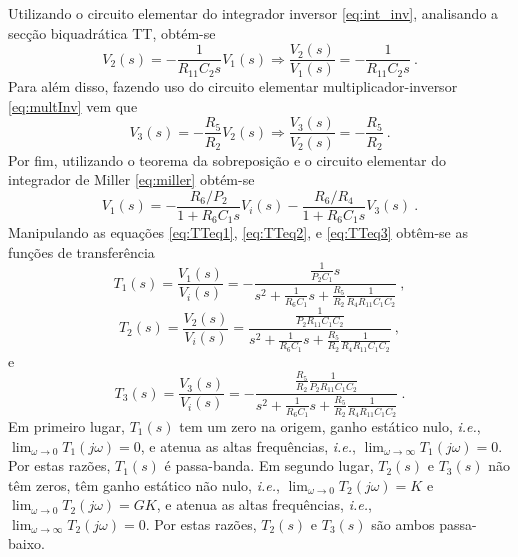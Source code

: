 Utilizando o circuito elementar do integrador inversor \eqref{eq:int_inv}, analisando a secção biquadrática TT, obtém-se
\begin{equation}\label{eq:TTeq1}
    V_2(s) = -\frac{1}{R_{11}C_2s}V_1(s)  \Rightarrow \frac{V_2(s)}{V_1(s)} = -\frac{1}{R_{11}C_2s}\:.
\end{equation}
Para além disso, fazendo uso do circuito elementar multiplicador-inversor \eqref{eq:multInv} vem que 
\begin{equation}\label{eq:TTeq2}
    V_3(s) = -\frac{R_5}{R_2}V_2(s) \Rightarrow \frac{V_3(s)}{V_2(s)} = -\frac{R_5}{R_2}\:.
\end{equation}
Por fim, utilizando o teorema da sobreposição e o circuito elementar do integrador de Miller \eqref{eq:miller} obtém-se
\begin{equation}\label{eq:TTeq3}
    V_1(s) = -\frac{R_6/P_2}{1+R_6C_1s}V_i(s) -\frac{R_6/R_4}{1+R_6C_1s}V_3(s)\:.
\end{equation}
Manipulando as equações \eqref{eq:TTeq1}, \eqref{eq:TTeq2}, e \eqref{eq:TTeq3} obtêm-se as funções de transferência 
\begin{equation}\label{eq:TTeq1M}
    T_1(s) = \frac{V_1(s)}{V_i(s)} = -\frac{\frac{1}{P_2C_1}s}{s^2+\frac{1}{R_6C_1}s+\frac{R_5}{R_2}\frac{1}{R_{4}R_{11}C_1C_2}}\:,
\end{equation}
\begin{equation}\label{eq:TTeq2M}
    T_2(s) = \frac{V_2(s)}{V_i(s)} = \frac{\frac{1}{P_2R_{11}C_1C_2}}{s^2+\frac{1}{R_6C_1}s+\frac{R_5}{R_2}\frac{1}{R_{4}R_{11}C_1C_2}} \:,
\end{equation}
e
\begin{equation}\label{eq:TTeq3M}
  T_3(s) = \frac{V_3(s)}{V_i(s)} = -\frac{\frac{R_5}{R_2}\frac{1}{P_2R_{11}C_1C_2}}{s^2+\frac{1}{R_6C_1}s+\frac{R_5}{R_2}\frac{1}{R_{4}R_{11}C_1C_2}}\:.
\end{equation}
Em primeiro lugar, $T_1(s)$ tem um zero na origem, ganho estático nulo, \textit{i.e.}, $\lim_{\omega \rightarrow 0} T_1(j\omega) = 0$, e atenua as altas frequências, \textit{i.e.}, $\lim_{\omega \rightarrow \infty} T_1(j\omega) = 0$. Por estas razões, $T_1(s)$ é passa-banda. Em segundo lugar, $T_2(s)$ e $T_3(s)$ não têm zeros, têm ganho estático não nulo, \textit{i.e.}, $\lim_{\omega \rightarrow 0} T_2(j\omega) = K$ e $\lim_{\omega \rightarrow 0} T_2(j\omega) = GK$, e atenua as altas frequências, \textit{i.e.}, $\lim_{\omega \rightarrow \infty} T_2(j\omega) = 0$. Por estas razões, $T_2(s)$ e $T_3(s)$ são ambos passa-baixo. 

